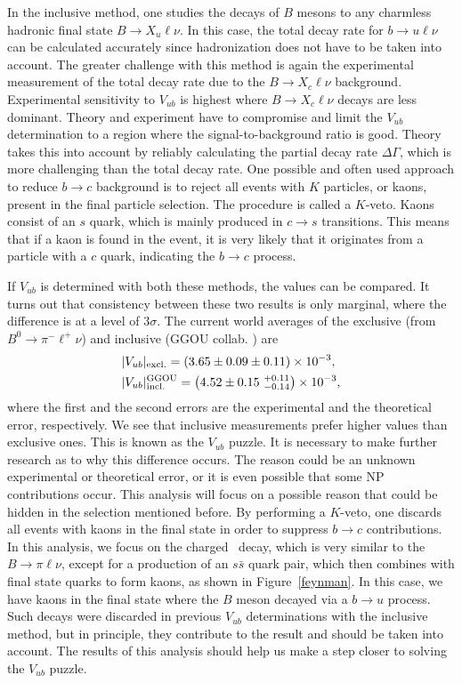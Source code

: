 In the inclusive method, one studies the decays of $B$ mesons to any charmless hadronic final state $B \to X_u \ell \nu$. In this case, the total decay rate for $b \to u \ell \nu$ can be calculated accurately since hadronization does not have to be taken into account. The greater challenge with this method is again the experimental measurement of the total decay rate due to the $B \to X_c \ell \nu$ background. Experimental sensitivity to $V_{ub}$ is highest where $B \to X_c \ell \nu$ decays are less dominant. Theory and experiment have to compromise and limit the $V_{ub}$ determination to a region where the signal-to-background ratio is good. Theory takes this into account by reliably calculating the partial decay rate $\Delta \Gamma$, which is more challenging than the total decay rate. One possible and often used approach to reduce $b \to c$ background is to reject all events with $K$ particles, or kaons, present in the final particle selection. The procedure is called a $K$-veto. Kaons consist of an $s$ quark, which is mainly produced in $c \to s$ transitions. This means that if a kaon is found in the event, it is very likely that it originates from a particle with a $c$ quark, indicating the $b \to c$ process. 

If $V_{ub}$ is determined with both these methods, the values can be compared. It turns out that consistency between these two results is only marginal, where the difference is at a level of $3\sigma$. The current world averages \cite{Amhis:2016xyh} of the exclusive (from $B^0 \to \pi^- \ell^+ \nu$) and inclusive (GGOU collab. \cite{Gambino:2007rp}) are
\begin{align}
&\vert V_{ub} \vert_{\mathrm{excl.}} = \left(3.65 \pm 0.09 \pm 0.11\right)\times 10^{-3},\\
&\vert V_{ub} \vert_{\mathrm{incl.}}^{\mathrm{GGOU}} = \left(4.52 \pm 0.15~{}^{+0.11}_{-0.14}\right)\times 10^{-3},
\end{align}
where the first and the second errors are the experimental and the theoretical error, respectively. We see that inclusive measurements prefer higher values than exclusive ones. This is known as the $V_{ub}$ puzzle. It is necessary to make further research as to why this difference occurs. The reason could be an unknown experimental or theoretical error, or it is even possible that some NP contributions occur. This analysis will focus on a possible reason that could be hidden in the selection mentioned before. By performing a $K$-veto, one discards all events with kaons in the final state in order to suppress $b \to c$ contributions. In this analysis, we focus on the charged \decaya~decay, which is very similar to the $B \to \pi \ell \nu$, except for a production of an $s \bar s$ quark pair, which then combines with final state quarks to form kaons, as shown in Figure~\ref{feynman}. In this case, we have kaons in the final state where the $B$ meson decayed via a $b \to u$ process. Such decays were discarded in previous $V_{ub}$ determinations with the inclusive method, but in principle, they contribute to the result and should be taken into account. The results of this analysis should help us make a step closer to solving the $V_{ub}$ puzzle. 

